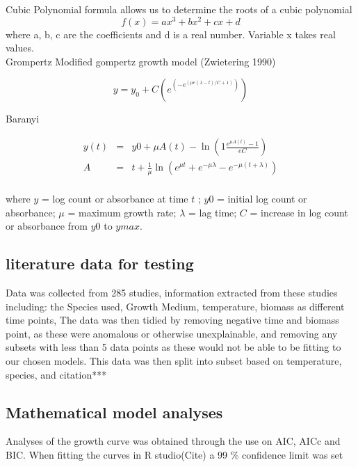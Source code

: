 \documentclass{article}
\begin{document}
	Cubic Polynomial formula allows us to determine the roots of a cubic polynomial
	\begin{equation}
	f(x)=ax^{3}+bx^{2}+cx+d
	\label{Cubic Poly}
	\end{equation}
	where a, b, c are the coefficients and d is a real number. Variable x takes real values.
	\\  
	Grompertz Modified gompertz growth model (Zwietering 1990)
	
	\begin{equation}
	y = y_{0} + C(e^{(-e^{(\mu e(\lambda - t)/C+1)})})
	\label{Grompertz}
	\end{equation}
	
	
	Baranyi
	
	\begin{equation}
	\begin{array}{ccl}
	y(t)  &  = & y0 + \mu A(t)- \ln(1 \frac{e ^{\mu A (t)}-1}{e C}) \\
	A  &   = & t + \frac{1}{\mu} \ln(e^{\mu t}+e^{-\mu\lambda}-e^{-\mu(t + \lambda)})\\
	\end{array}
	\label{Barayi formula}
	\end{equation}
	
	where \(y\) = log count or absorbance at time \(t\) ; \(y0\) = initial log count or absorbance; \(\mu\) = maximum growth rate; \(\lambda\) = lag time;  \(C\) = increase in log count or absorbance from \(y0\) to \(ymax\). 
	
	
	
	
	\subsection{literature data for testing}
	Data was collected from 285 studies, information extracted from these studies including: the Species used, Growth Medium, temperature, biomass as different time points, The data was then tidied by removing negative time and biomass point, as these were anomalous or otherwise unexplainable, and removing any subsets with less than 5 data points as these would not be able to be fitting to our chosen models. This data was then split into subset based on temperature, species, and citation***
	\\
	\subsection{Mathematical model analyses}
	Analyses of the growth curve was obtained through the use on AIC, AICc and BIC. When fitting the curves in R studio(Cite) a 99 \% confidence limit was set
	
\end{document}
